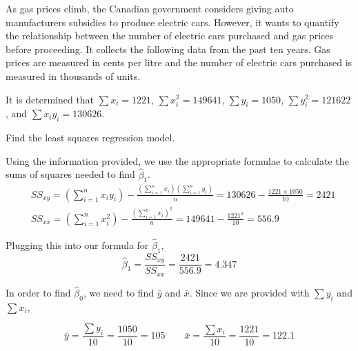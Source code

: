 \begin{example}
As gas prices climb, the Canadian government considers giving auto manufacturers subsidies to produce electric cars. However, it wants to quantify the relationship between the number of electric cars purchased and gas prices before proceeding. It collects the following data from the past ten years. Gas prices are measured in cents per litre and the number of electric cars purchased is measured in thousands of units.
\begin{center}
\def\arraystretch{1.5}
\end{center}

It is determined that $\sum x_i = 1221$,
$\sum x_i^2 = 149641$,
$\sum y_i = 1050$,
$\sum y_i^2 = 121622$, and 
$\sum x_i y_i = 130626$.

\begin{benumerate}
\item Find the least squares regression model.

Using the information provided, we use the appropriate formulae to calculate the sums of squares needed to find $\hat{\beta}_1$.
\begin{align*}
&SS_{xy} = \left( \sum_{i=1}^{n} x_i y_i \right) - \frac{ \left( \sum_{i=1}^{n} x_i \right) \left( \sum_{i=1}^{n} y_i \right)}{n} = 130626 - \frac{ 1221 \times 1050 }{10} = 2421 \\
&SS_{xx} = \left( \sum_{i=1}^{n} x_i^2 \right) - \frac{ \left( \sum_{i=1}^{n} x_i \right)^2}{n} = 149641 - \frac{ 1221^2 }{10} = 556.9
\end{align*}

Plugging this into our formula for $\hat{\beta}_1$,
\[ \hat{\beta}_1 = \frac{SS_{xy}}{SS_{xx}} = \frac{2421}{556.9}=4.347\]

In order to find $\hat{\beta}_0$, we need to find $\bar{y}$ and $\bar{x}$. Since we are provided with $\sum y_i$ and $\sum x_i$,

\[ \bar{y} = \frac{\sum y_i}{10} =  \frac{1050}{10} = 105 \qquad \bar{x} = \frac{\sum x_i}{10} = \frac{1221}{10} = 122.1\]


\end{benumerate}
\end{example}

